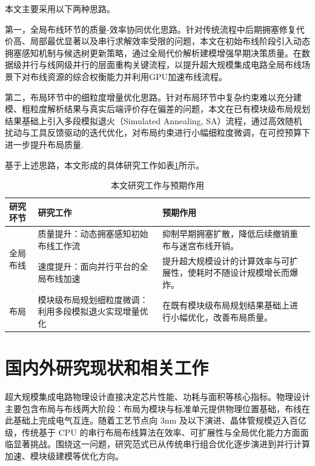 本文主要采用以下两种思路。

第一，全局布线环节的质量-效率协同优化思路。针对传统流程中后期拥塞修复代价高、局部最优显著以及串行求解效率受限的问题，本文在初始布线阶段引入动态拥塞感知机制与候选树更新策略，通过全局代价解析建模增强早期决策质量。在数据级并行与线网级并行的层面重构关键流程，以提升超大规模集成电路全局布线场景下对布线资源的综合权衡能力并利用GPU加速布线流程。

第二，布局环节中的细粒度增量优化思路。针对布局环节中复杂约束难以充分建模、粗粒度解析结果与真实后端评价存在偏差的问题，本文在已有模块级布局规划结果基础上引入多段模拟退火（Simulated Annealing, SA）流程，通过高效随机扰动与工具反馈驱动的迭代优化，对布局约束进行小幅细粒度微调，在可控预算下进一步提升布局质量.



基于上述思路，本文形成的具体研究工作如表\ref{tab:chap1_contributions}所示。

\begin{table}[htbp]
	\centering
	\caption{本文研究工作与预期作用}
	\label{tab:chap1_contributions}
	\begin{tabular}{p{}p{}p{}}
		\toprule
		研究环节 & 研究工作 & 预期作用 \\
		\midrule
		\multirow{2}{*}{全局布线} & 质量提升：动态拥塞感知初始布线工作流 & 抑制早期拥塞扩散，降低后续撤销重布与迷宫布线开销。 \\
		 & 速度提升：面向并行平台的全局布线加速 & 提升超大规模设计的计算效率与可扩展性，使耗时不随设计规模增长而爆炸。 \\
		\midrule
		布局 & 模块级布局规划细粒度微调：利用多段模拟退火实现增量优化 & 在既有模块级布局规划结果基础上进行小幅优化，改善布局质量。 \\
		\bottomrule
	\end{tabular}
\end{table}


\section{国内外研究现状和相关工作}
\label{sec:related_work}

超大规模集成电路物理设计直接决定芯片性能、功耗与面积等核心指标。物理设计主要包含布局与布线两大阶段：布局为模块与标准单元提供物理位置基础，布线在此基础上完成电气互连。随着工艺节点向 3nm 及以下演进、晶体管规模迈入百亿级，传统基于 CPU 的串行布局布线算法在效率、可扩展性与全局优化能力方面面临显著挑战。围绕这一问题，研究范式已从传统串行组合优化逐步演进到并行计算加速、模块级建模等优化方向。

